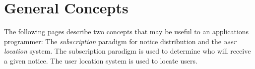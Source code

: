 %
\section{General Concepts}
\label{general-concepts}

The following pages describe two concepts that may be useful to an
applications programmer: The {\em subscription\/} paradigm for notice
distribution and the {\em user location\/} system.  The subscription
paradigm is used to determine who will receive a given notice.  The
user location system is used to locate users.




